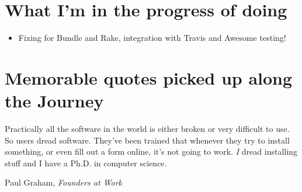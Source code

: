 \section{What I'm in the progress of doing}
\begin{itemize}
\item Fixing for Bundle and Rake, integration with Travis and Awesome testing!
\end{itemize}

\section{Memorable quotes picked up along the Journey}
\epigraph{Practically all the software in the world is either broken or very difficult to use. So users dread software. They've been trained that whenever they try to install something, or even fill out a form online, it's not going to work. \textit{I} dread installing stuff and I have a Ph.D. in computer science.}{Paul Graham, \textit{Founders at Work} \cite{rubytutorial}}